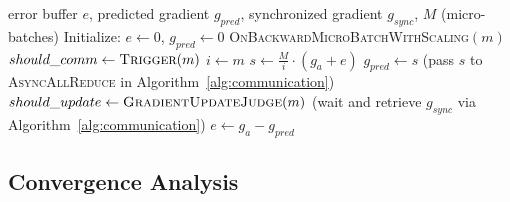 \begin{algorithm}[tb]
  \caption{Error Feedback Mechanism with Gradient Scaling}
  \label{alg:error_feedback}
  \begin{algorithmic}
     error buffer $e$, predicted gradient $g_{pred}$, synchronized gradient $g_{sync}$, $M$ (micro-batches)
    \STATE Initialize: $e \leftarrow 0$, $g_{pred} \leftarrow 0$
     \textsc{OnBackwardMicroBatchWithScaling}$(m)$
    \STATE $should\_comm \leftarrow \textsc{Trigger}(m)$
      \STATE $i \leftarrow m$
      \STATE $s \leftarrow \frac{M}{i} \cdot (g_a + e)$
      \STATE $g_{pred} \leftarrow s$
      \STATE (pass $s$ to \textsc{AsyncAllReduce} in Algorithm~\ref{alg:communication})
    \ENDIF
    \STATE $should\_update \leftarrow \textsc{GradientUpdateJudge}(m)$
      \STATE (wait and retrieve $g_{sync}$ via Algorithm~\ref{alg:communication})
      \STATE $e \leftarrow g_a - g_{pred}$
    \ENDIF
  \end{algorithmic}
\end{algorithm}

\subsection{Convergence Analysis}






